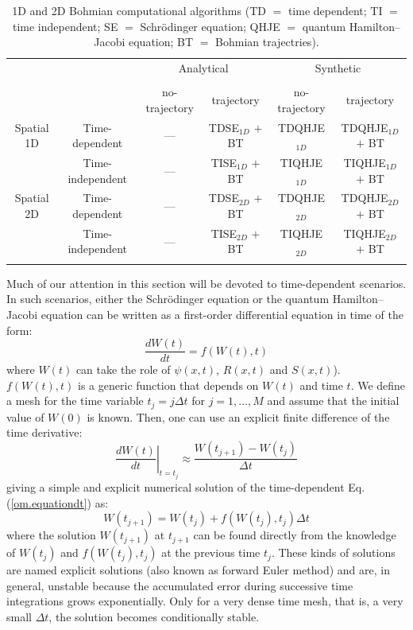 \documentclass[nofootinbib, secnumarabic, amsmath, nobibnotes,11pt,aps,pra, floatfix]{revtex4-1}
\newcommand{\eref}[1]{Eq. (\ref{#1})}
\begin{document}
\begin{table}
\centering
\caption{1D and 2D Bohmian computational algorithms (TD $=$ time dependent; TI $=$ time independent; SE $=$ Schr\"odinger equation; QHJE $=$ quantum Hamilton--Jacobi equation; BT $=$ Bohmian trajectries).}{%
\begin{tabular}{@{}cccccc@{}} \toprule
 & & \multicolumn{2}{c}{Analytical} & \multicolumn{2}{c}{Synthetic} \\
 \cline{3-6}\\[-10pt]
 & & no-trajectory & trajectory & no-trajectory & trajectory \\ \colrule
 Spatial 1D & Time-dependent & --- & TDSE$_{1D}$ $+$ BT & TDQHJE$_{1D}$ & TDQHJE$_{1D}$ $+$ BT\\
 & Time-independent & --- & TISE$_{1D}$ $+$ BT & TIQHJE$_{1D}$ & TIQHJE$_{1D}$ $+$ BT\\ \botrule
 Spatial 2D & Time-dependent & --- & TDSE$_{2D}$ $+$ BT & TDQHJE$_{2D}$ & TDQHJE$_{2D}$ $+$ BT\\
 & Time-independent & --- & TISE$_{2D}$ $+$ BT & TIQHJE$_{2D}$ & TIQHJE$_{2D}$ $+$ BT\\ \botrule
\end{tabular}}\label{tblA.1}
\end{table}

Much of our attention in this section will be devoted to
time-dependent scenarios. In such scenarios, either the
Schr\"odinger equation or the quantum Hamilton--Jacobi equation can
be written as a first-order differential equation in time of the
form:\enlargethispage{-1pc}
\begin{equation}
\label{om.equationdt}
\frac {dW(t)} {dt} = f(W(t),t)
\end{equation}
where $W(t)$ can take the role of $\psi(x,t)$, $R(x,t)$ and
$S(x,t)$). $f(W(t),t)$ is a generic function that depends on $W(t)$
and time $t$.  We define a mesh for the time variable $t_j = j
\Delta t$ for $j = 1,\ldots,M$ and assume that the initial value of
$W(0)$ is known. Then, one can use an explicit finite difference of
the time derivative:
\begin{equation}
\left.\frac {dW(t)} {dt}\right|_{t = t_j} \approx \frac {W(t_{j + 1})-W(t_j)} {\Delta t}
\end{equation}
giving a simple and explicit numerical solution of the time-dependent \eref{om.equationdt} as:
\begin{equation}
\label{om.explicit}
W(t_{j + 1}) = W(t_j) + f(W(t_j),t_j) \Delta t
\end{equation}
where the solution $W(t_{j + 1})$ at $t_{j + 1}$ can be found
directly from the knowledge of $W(t_j)$ and $f(W(t_j),t_j)$ at the
previous time $t_j$. These kinds of solutions are named explicit
solutions  (also known as forward Euler method) and are, in general,
unstable because the accumulated error during successive time integrations grows
exponentially. Only for a very dense time mesh, that is, a very
small $\Delta t$, the solution becomes conditionally stable.
\end{document}
